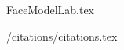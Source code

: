 \documentclass[aspectratio=\BeamerAspectRatio]{beamer}
\begin{document}
\maketitlepage %
\maketableofcontents %
\makesectionpopup %

{FaceModelLab.tex}

{/citations/citations.tex}
\end{document}
